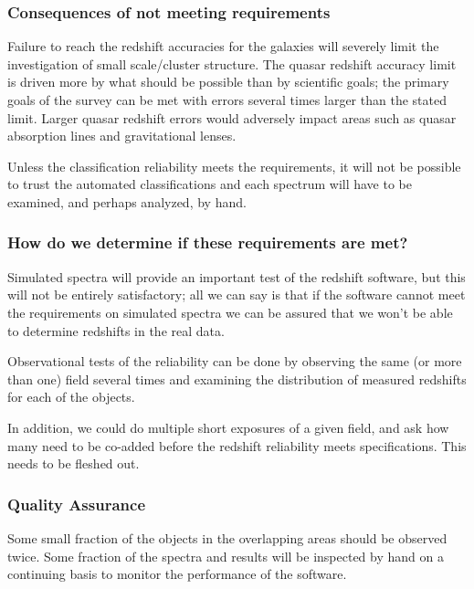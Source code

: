 \subsubsection{Consequences of not meeting requirements}

Failure to reach the redshift accuracies for the galaxies will
severely limit the investigation of small scale/cluster structure.
The quasar redshift accuracy limit is driven more by what should be
possible than by scientific goals; the primary goals of the survey can
be met with errors several times larger than the stated limit.  Larger
quasar redshift errors would adversely impact areas such as quasar
absorption lines and gravitational lenses.

Unless the classification reliability meets the requirements, it will
not be possible to trust the automated classifications and each
spectrum will have to be examined, and perhaps analyzed, by hand. 

\subsubsection{How do we determine if these requirements are met?}
Simulated spectra will provide an important test of the redshift
software, but this will not be entirely satisfactory; all we can say
is that if the software cannot meet the requirements on simulated
spectra we can be assured that we won't be able to determine redshifts
in the real data.

Observational tests of the reliability can be done by observing the
same (or more than one) field several times and examining the distribution
of measured redshifts for each of the objects.

In addition, we could do multiple short exposures of a given field,
and ask how many need to be co-added before the redshift reliability
meets specifications.  This needs to be fleshed out. 

\subsubsection{Quality Assurance}
Some small fraction of the objects in the overlapping areas should
be observed twice.  Some fraction of the spectra and results will be inspected
by hand on a continuing basis to monitor the performance of the software.

